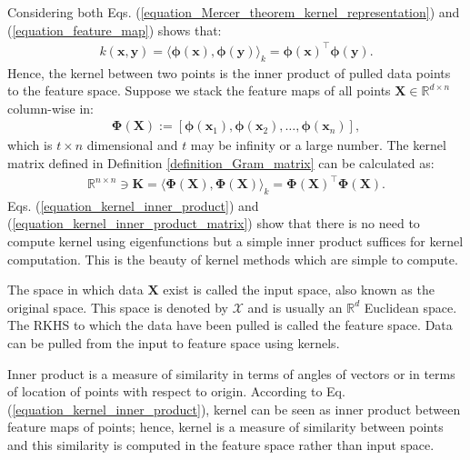 \documentclass[lang=cn,10pt]{gorgeousnbook}
\numberwithin{equation}{section}%
\numberwithin{figure}{section}%
\begin{document}
Considering both Eqs. (\ref{equation_Mercer_theorem_kernel_representation}) and (\ref{equation_feature_map}) shows that:
\begin{align}\label{equation_kernel_inner_product}
k(\boldsymbol{x}, \boldsymbol{y}) = \big\langle \boldsymbol{\phi}(\boldsymbol{x}), \boldsymbol{\phi}(\boldsymbol{y}) \big\rangle_k = \boldsymbol{\phi}(\boldsymbol{x})^\top \boldsymbol{\phi}(\boldsymbol{y}). 
\end{align}
Hence, the kernel between two points is the inner product of pulled data points to the feature space. 
Suppose we stack the feature maps of all points $\boldsymbol{X} \in \mathbb{R}^{d \times n}$ column-wise in:
\begin{align}\label{equation_Phi_X_pulled_matrix}
\boldsymbol{\Phi}(\boldsymbol{X}) := [\boldsymbol{\phi}(\boldsymbol{x}_1), \boldsymbol{\phi}(\boldsymbol{x}_2), \dots, \boldsymbol{\phi}(\boldsymbol{x}_n)],
\end{align}
which is $t \times n$ dimensional and $t$ may be infinity or a large number. 
The kernel matrix defined in Definition \ref{definition_Gram_matrix} can be calculated as:
\begin{align}\label{equation_kernel_inner_product_matrix}
\mathbb{R}^{n \times n} \ni \boldsymbol{K} = \big\langle \boldsymbol{\Phi}(\boldsymbol{X}), \boldsymbol{\Phi}(\boldsymbol{X}) \big\rangle_k =  \boldsymbol{\Phi}(\boldsymbol{X})^\top \boldsymbol{\Phi}(\boldsymbol{X}).
\end{align}
Eqs. (\ref{equation_kernel_inner_product}) and (\ref{equation_kernel_inner_product_matrix}) show that there is no need to compute kernel using eigenfunctions but a simple inner product suffices for kernel computation. This is the beauty of kernel methods which are simple to compute. 

\begin{definition}
The space in which data $\boldsymbol{X}$ exist is called the input space, also known as the original space. This space is denoted by $\mathcal{X}$ and is usually an $\mathbb{R}^d$ Euclidean space. The RKHS to which the data have been pulled is called the feature space. Data can be pulled from the input to feature space using kernels. 
\end{definition}

\begin{remark}\label{remark_kernel_is_similarity}
Inner product is a measure of similarity in terms of angles of vectors or in terms of location of points with respect to origin. According to Eq. (\ref{equation_kernel_inner_product}), kernel can be seen as inner product between feature maps of points; hence, kernel is a measure of similarity between points and this similarity is computed in the feature space rather than input space. 
\end{remark}
\end{document}
